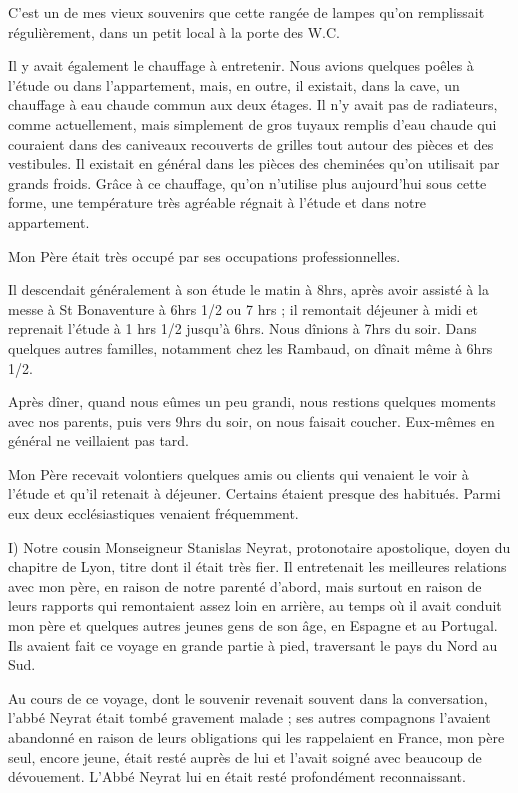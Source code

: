 \documentclass[11pt,a4paper]{report}
\begin{document}
C'est un de mes vieux souvenirs que cette rangée de lampes qu'on remplissait régulièrement, dans un petit local à la porte des W.C.

Il y avait également le chauffage à entretenir. Nous avions quelques poêles à l'étude ou dans l'appartement, mais, en outre, il existait, dans la cave, un chauffage à eau chaude commun aux deux étages. Il n'y avait pas de radiateurs, comme actuellement, mais simplement de gros tuyaux remplis d'eau chaude qui couraient dans des caniveaux recouverts de grilles tout autour des pièces et des vestibules. Il existait en général dans les pièces des cheminées qu'on utilisait par grands froids. Grâce à ce chauffage, qu'on n'utilise plus aujourd'hui sous cette forme, une température très agréable régnait à l'étude et dans notre appartement.

Mon Père était très occupé par ses occupations professionnelles.

Il descendait généralement à son étude le matin à 8hrs, après avoir assisté à la messe à St Bonaventure à 6hrs 1/2 ou 7 hrs ; il remontait déjeuner à midi et reprenait l'étude à 1 hrs 1/2 jusqu'à 6hrs. Nous dînions à 7hrs du soir. Dans quelques autres familles, notamment chez les Rambaud, on dînait même à 6hrs 1/2.

Après dîner, quand nous eûmes un peu grandi, nous restions quelques moments avec nos parents, puis vers 9hrs du soir, on nous faisait coucher. Eux-mêmes en général ne veillaient pas tard.

Mon Père recevait volontiers quelques amis ou clients qui venaient le voir à l'étude et qu'il retenait à déjeuner. Certains étaient presque des habitués. Parmi eux deux ecclésiastiques venaient fréquemment.

I) Notre cousin Monseigneur Stanislas Neyrat, protonotaire apostolique, doyen du chapitre de Lyon, titre dont il était très fier. Il entretenait les meilleures relations avec mon père, en raison de notre parenté d'abord, mais surtout en raison de leurs rapports qui remontaient assez loin en arrière, au temps où il avait conduit mon père et quelques autres jeunes gens de son âge, en Espagne et au Portugal. Ils avaient fait ce voyage en grande partie à pied, traversant le pays du Nord au Sud.

Au cours de ce voyage, dont le souvenir revenait souvent dans la conversation, l'abbé Neyrat était tombé gravement malade ; ses autres compagnons l'avaient abandonné en raison de leurs obligations qui les rappelaient en France, mon père seul, encore jeune, était resté auprès de lui et l'avait soigné avec beaucoup de dévouement. L'Abbé Neyrat lui en était resté profondément reconnaissant.
\end{document}
